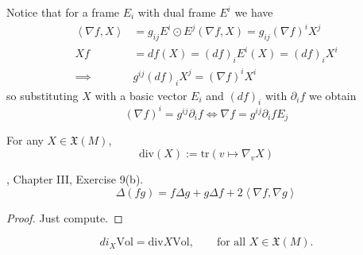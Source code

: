 Notice that for a frame $E_i$ with dual frame $E^i$ we have
\begin{align*}
\left<\nabla f,X\right>&=g_{ij}E^i\odot E^j(\nabla f,X)
=g_{ij}(\nabla f)^iX^j\\
Xf&=df(X)=(df)_iE^i(X)=(df)_iX^i\\
\implies& g^{ij}(df)_iX^j=(\nabla f)^iX^i
\end{align*}
so substituting $X$ with a basic vector $E_i$ and $(df)_i$ with $\partial_if$ we
obtain
\begin{equation}
\label{equation-gradient-in-coordinates}
(\nabla f)^i=g^{ij}\partial_if \iff \nabla f=g^{ij}\partial_ifE_j
\end{equation}

\begin{definition}
\label{definition-divergence}
For any $X\in \mathfrak{X}(M)$,
$$
\text{div}(X):=\text{tr}(v\mapsto \nabla_vX)
$$
\end{definition}

\begin{lemma}
\label{lemma-Laplacian-of-product}
\cite{doc}, Chapter III, Exercise 9(b).
\begin{equation}
\label{equation-Laplacian-of-product}
\Delta(fg)=f \Delta g + g \Delta f+2\left<\nabla f,\nabla g\right>
\end{equation}
\end{lemma}

\begin{proof}
Just compute.
\end{proof}

\begin{lemma}
\label{lemma-divergence-and-volume}
\begin{equation}
\label{equation-divergence-and-volume}
di_X\text{Vol}=\text{div}X\text{Vol},\qquad \text{for all }X\in \mathfrak{X}(M).
\end{equation}
\end{lemma}

